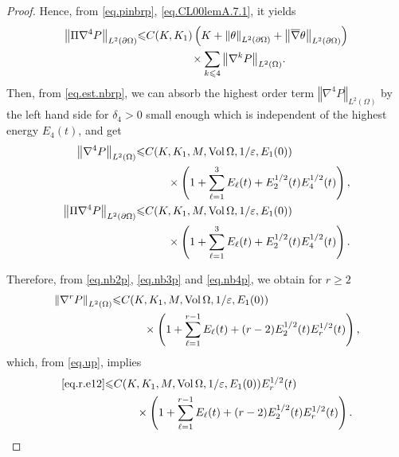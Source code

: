 \documentclass[12pt,reqno]{amsart}
\numberwithin{equation}{section}
\theoremstyle{definition}
\theoremstyle{remark}
\begin{document}
\begin{proof}
Hence, from \eqref{eq.pinbrp}, \eqref{eq.CL00lemA.7.1}, it yields
\begin{align}
  {\left\Vert{\Pi{\nabla}^4{P }}\right\Vert}_{L^2({\partial}\Omega)}{\leqslant} &C(K,K_1)\left(K+{\left\Vert{\theta}\right\Vert}_{L^2({\partial}\Omega)}+ {\left\Vert{{\overline{\nabla}} \theta}\right\Vert}_{L^2({\partial}\Omega)}\right){\nonumber}\\
  &\qquad\qquad\times\sum_{k{\leqslant} 4}{\left\Vert{{\nabla}^k{P }}\right\Vert}_{L^2(\Omega)}.\label{eq.nb4p}
\end{align}
Then, from \eqref{eq.est.nbrp}, we can absorb the highest order term ${\left\Vert{{\nabla}^4{P }}\right\Vert}_{L^2(\Omega)}$ by the left hand side for $\delta_4>0$ small enough which is independent of the highest energy $E_4(t)$, and get
\begin{align}
  {\left\Vert{{\nabla}^4{P }}\right\Vert}_{L^2(\Omega)}{\leqslant}& C(K,K_1,M,{\mathrm{Vol}\,}\Omega,1/{\varepsilon},E_1(0)){\nonumber}\\
  &\qquad\times\left(1+\sum_{\ell=1}^3 E_\ell(t)+E_2^{1/2}(t)E_4^{1/2}(t)\right),\\
  {\left\Vert{\Pi{\nabla}^4{P }}\right\Vert}_{L^2({\partial}\Omega)}{\leqslant}& C(K,K_1,M,{\mathrm{Vol}\,}\Omega,1/{\varepsilon},E_1(0)){\nonumber}\\
  &\qquad\times\left(1+\sum_{\ell=1}^3 E_\ell(t)+E_2^{1/2}(t)E_4^{1/2}(t)\right).
\end{align}

Therefore, from \eqref{eq.nb2p}, \eqref{eq.nb3p} and \eqref{eq.nb4p}, we obtain for $r{\geqslant} 2$
\begin{align}
  {\left\Vert{{\nabla}^r{P }}\right\Vert}_{L^2(\Omega)}{\leqslant} &C(K,K_1,M,{\mathrm{Vol}\,}\Omega,1/{\varepsilon},E_1(0)){\nonumber}\\
  &\qquad\times\left(1+\sum_{\ell=1}^{r-1} E_\ell(t)+(r-2)E_2^{1/2}(t)E_r^{1/2}(t)\right),
\end{align}
which, from \eqref{eq.up}, implies
\begin{align}
  \eqref{eq.r.e12}{\leqslant}& C(K,K_1,M,{\mathrm{Vol}\,}\Omega,1/{\varepsilon},E_1(0))E_r^{1/2}(t){\nonumber}\\
  &\qquad\times\left(1+\sum_{\ell=1}^{r-1} E_\ell(t)+(r-2)E_2^{1/2}(t)E_r^{1/2}(t)\right).
\end{align}


\end{proof}
\end{document}
